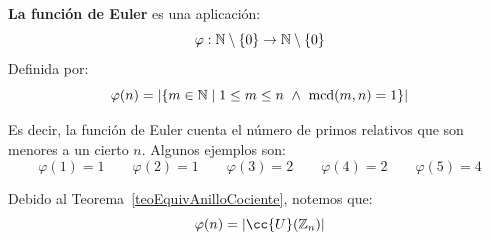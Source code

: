 \begin{definicion}
    \textbf{La función de Euler} es una aplicación:
    $$\varphi:\mathbb N\setminus\{0\}\rightarrow\mathbb N\setminus\{0\}$$
    Definida por:
    $$\varphi(n) = |\{m \in \mathbb N \mid 1\leq m\leq n \ \land \  \operatorname{mcd}(m,n)=1\}|$$
\end{definicion}

Es decir, la función de Euler cuenta el número de primos relativos que son menores a un cierto $n$. Algunos ejemplos son:
\begin{equation*}
    \varphi(1)=1 \qquad \varphi(2)=1 \qquad \varphi(3)=2 \qquad \varphi(4)=2 \qquad \varphi(5)=4
\end{equation*}

Debido al Teorema~\ref{teoEquivAnilloCociente}, notemos que:
$$\varphi(n) = |\cc{U}(\Z_n)|$$


